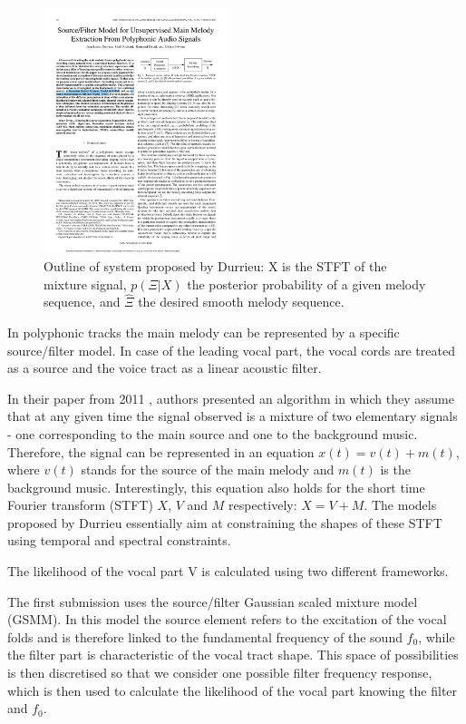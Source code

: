 \begin{figure}
  \vspace{-50pt}

  \begin{center}
    \includegraphics[width=0.48\textwidth]{Figures/durrieudiagram}
  \end{center}
  \caption{Outline of system proposed by Durrieu: X is the STFT of the mixture signal, $p(\Xi|X)$ the posterior probability of a given melody sequence, and $\hat{\Xi} $ the desired smooth melody sequence\cite{durrieu}.}
  \label{fig:durrieu}
\end{figure}


In polyphonic tracks the main melody can be represented by a specific source/filter model. In case of the leading vocal part, the vocal cords are treated as a source and the voice tract as a linear acoustic filter.

In their paper from 2011 \cite{durrieu}, authors presented an algorithm in which they assume that at any given time the signal observed is a mixture of two elementary signals - one corresponding to the main source and one to the background music. Therefore, the signal can be represented in an equation $x(t) = v(t) + m(t)$, where $v(t)$ stands for the source of the main melody and $m(t)$ is the background music. Interestingly, this equation also holds for the short time Fourier transform (STFT)  $X$, $V$ and $M$ respectively: $X = V + M$. The models proposed by Durrieu essentially aim at constraining the shapes of these STFT using temporal and spectral constraints. 


The likelihood of the vocal part V is calculated using two different frameworks. 

The first submission uses the source/filter Gaussian scaled mixture model (GSMM). In this model the source element refers to the excitation of the vocal folds and is therefore linked to the fundamental frequency of the sound $f_{\text{0}}$, while the filter part is characteristic of the vocal tract shape. This space of possibilities is then discretised so that we consider one possible filter frequency response, which is then used to calculate the likelihood of the vocal part knowing the filter and $f_{\text{0}}$.

